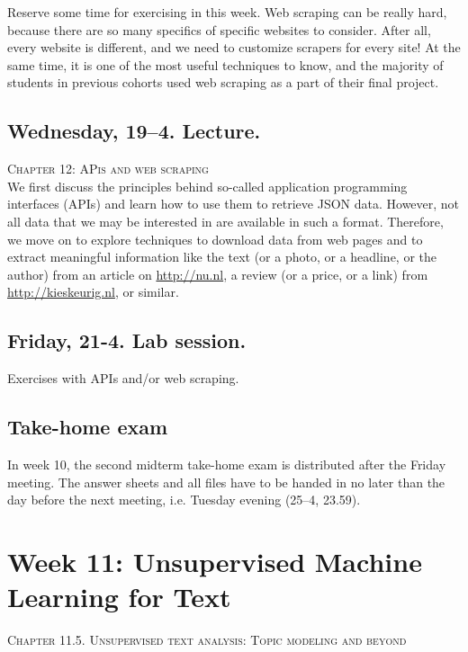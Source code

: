Reserve some time for exercising in this week. Web scraping can be really hard, because there are so many specifics of specific websites to consider. After all, every website is different, and we need to customize scrapers for every site! At the same time, it is one of the most useful techniques to know, and the majority of students in previous cohorts used web scraping as a part of their final project.

\subsection*{Wednesday, 19--4. Lecture.}
\textsc{ Chapter 12: APis and web scraping}\\

We first discuss the principles behind so-called application programming interfaces (APIs) and learn how to use them to retrieve JSON data. However, not all data that we may be interested in are available in such a format. Therefore, we move on to explore techniques to download data from web pages and to extract meaningful information like the text (or a photo, or a headline, or the author) from an article on \url{http://nu.nl}, a review (or a price, or a link) from \url{http://kieskeurig.nl}, or similar.



\subsection*{Friday, 21-4. Lab session.}

Exercises with APIs and/or web scraping.


\subsection*{Take-home exam}
In week 10, the second midterm take-home exam is distributed after the Friday meeting. The answer sheets and all files have to be handed in no later than the day before the next meeting, i.e. Tuesday evening (25--4, 23.59).






\section*{Week 11: Unsupervised Machine Learning for Text}
\textsc{ Chapter 11.5. Unsupervised text analysis: Topic modeling and beyond}\\

